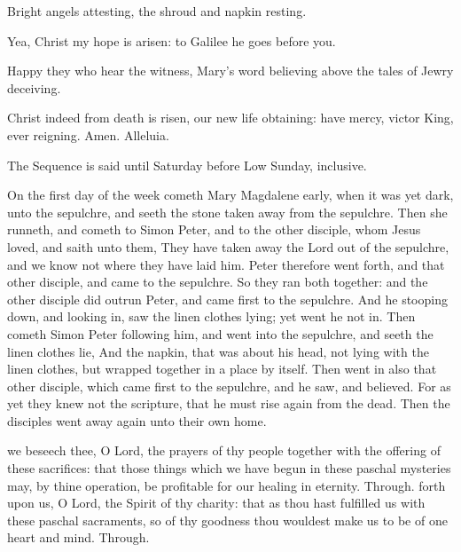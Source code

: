 Bright angels attesting, the shroud and napkin resting.\par
Yea, Christ my hope is arisen: to Galilee he goes before you.\par
Happy they who hear the witness, Mary's word believing above the tales of Jewry deceiving.\par
Christ indeed from death is risen, our new life obtaining: have mercy, victor King, ever reigning. Amen. Alleluia.
\begin{rubric}
     The Sequence is said until Saturday before Low Sunday, inclusive.
\end{rubric}
 On the first day of the week cometh Mary Magdalene early, when it was yet dark, unto the sepulchre, and seeth the stone taken away from the sepulchre. Then she runneth, and cometh to Simon Peter, and to the other disciple, whom Jesus loved, and saith unto them, They have taken away the Lord out of the sepulchre, and we know not where they have laid him. Peter therefore went forth, and that other disciple, and came to the sepulchre. So they ran both together: and the other disciple did outrun Peter, and came first to the sepulchre. And he stooping down, and looking in, saw the linen clothes lying; yet went he not in. Then cometh Simon Peter following him, and went into the sepulchre, and seeth the linen clothes lie, And the napkin, that was about his head, not lying with the linen clothes, but wrapped together in a place by itself. Then went in also that other disciple, which came first to the sepulchre, and he saw, and believed. For as yet they knew not the scripture, that he must rise again from the dead. Then the disciples went away again unto their own home.


\secret
{} we beseech thee, O Lord, the prayers of thy people together with the offering of these sacrifices: that those things which we have begun in these paschal mysteries may, by thine operation, be profitable for our healing in eternity. Through.
\postcommunion
{} forth upon us, O Lord, the Spirit of thy charity: that as thou hast fulfilled us with these paschal sacraments, so of thy goodness thou wouldest make us to be of one heart and mind. Through.

